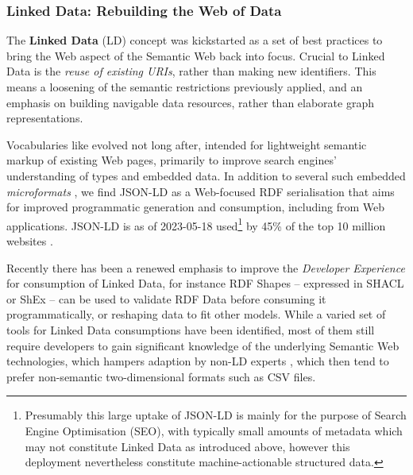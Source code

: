 \subsubsection{Linked Data: Rebuilding the Web of Data}\label{ch3:ld-web}

The \textbf{Linked Data} (LD) concept \cite{Bizer 2009} was kickstarted as a set of best practices \cite{LinkedDataDesign} to bring the Web aspect of the Semantic Web back into focus. Crucial to Linked Data is the \emph{reuse of existing URIs}, rather than making new identifiers. This means a loosening of the semantic restrictions previously applied, and an emphasis on building navigable data resources, rather than elaborate graph representations.

Vocabularies like  evolved not long after, intended for lightweight semantic markup of existing Web pages, primarily to improve search engines' understanding of types and embedded data. In addition to several such embedded \emph{microformats} \cite{OpenGraphProtocol,w3-rdfa-primer,HTMLStandard}, we find JSON-LD \cite{w3-json-ld} as a Web-focused RDF serialisation that aims for improved programmatic generation and consumption, including from Web applications. JSON-LD is as of 2023-05-18 used\footnote{Presumably this large uptake of JSON-LD is mainly for the purpose of Search Engine Optimisation (SEO), with typically small amounts of metadata which may not constitute Linked Data as introduced above, however this deployment nevertheless constitute machine-actionable structured data.} by 45\% of the top 10 million websites \cite{UsageStatisticsJSONLD}.

Recently there has been a renewed emphasis to improve the \emph{Developer Experience} \cite{DesigningLinkedData2018} for consumption of Linked Data, for instance RDF Shapes -- expressed in SHACL \cite{w3-shacl} or ShEx \cite{ShapeExpressionsShEx} -- can be used to validate RDF Data \cite{gayoValidatingRDFData2017a,thorntonUsingShapeExpressions2019a} before consuming it programmatically, or reshaping data to fit other models. While a varied set of tools for Linked Data consumptions have been identified, most of them still require developers to gain significant knowledge of the underlying Semantic Web technologies, which hampers adaption by non-LD experts \cite{klimekSurveyToolsLinked2019a}, which then tend to prefer non-semantic two-dimensional formats such as CSV files.

